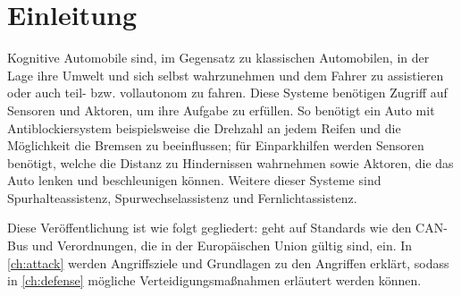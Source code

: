 
\section{Einleitung}
Kognitive Automobile sind, im Gegensatz zu klassischen Automobilen, in der Lage
ihre Umwelt und sich selbst wahrzunehmen und dem Fahrer zu assistieren oder
auch teil- bzw. vollautonom zu fahren. Diese Systeme benötigen Zugriff auf
Sensoren und Aktoren, um ihre Aufgabe zu erfüllen. So benötigt ein Auto mit
Antiblockiersystem beispielsweise die Drehzahl an jedem Reifen und die
Möglichkeit die Bremsen zu beeinflussen; für Einparkhilfen werden Sensoren
benötigt, welche die Distanz zu Hindernissen wahrnehmen sowie Aktoren, die das
Auto lenken und beschleunigen können. Weitere dieser Systeme sind
Spurhalteassistenz, Spurwechselassistenz und Fernlichtassistenz.

Diese Veröffentlichung ist wie folgt gegliedert:  geht auf
Standards wie den CAN-Bus und Verordnungen, die in der Europäischen Union
gültig sind, ein. In \cref{ch:attack} werden Angriffsziele und Grundlagen zu
den Angriffen erklärt, sodass in
\cref{ch:defense} mögliche Verteidigungsmaßnahmen erläutert werden können.
